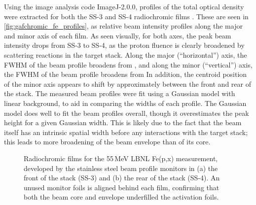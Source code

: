 Using the image analysis code  ImageJ-2.0.0,  profiles of the total optical density were extracted for both the SS-3 and SS-4 radiochromic films \cite{Rueden2017}.
These are seen in \autoref{fig:gafchromic_fe_profiles}, as relative beam intensity profiles along the major and minor axis of each film.
As seen visually, for both axes, the peak beam intensity drops from SS-3 to SS-4, as the proton fluence is clearly broadened by scattering reactions in the target stack.
Along the major (\enquote{horizontal}) axis, the FWHM of the beam profile broadens from , and along the minor (\enquote{vertical}) axis, the FWHM of the beam profile broadens from 
In addition, the centroid position of the minor axis appears to shift by approximately  between the front and rear of the stack. 
The measured beam profiles were fit using a Gaussian model with linear background, to aid in comparing the widths of each profile.
The Gaussian model does well to fit the beam profiles overall, though it overestimates the peak height for a given Gaussian width.
This is likely due to the fact that the beam itself has an intrinsic spatial width before any interactions with the target stack; this leads to more broadening of the beam envelope than of its core.

    

% 
\begin{figure}
    \centering
    \caption{ Radiochromic films for the 55\,MeV LBNL Fe(p,x) measurement, developed by the stainless steel beam profile monitors in (a) the front of the stack (SS-3) and (b) the rear of the stack (SS-4). An unused  monitor foils is aligned behind each film, confirming that both the beam core and envelope underfilled the activation foils.}
     \label{fig:gafchromic_fe}
\end{figure}





